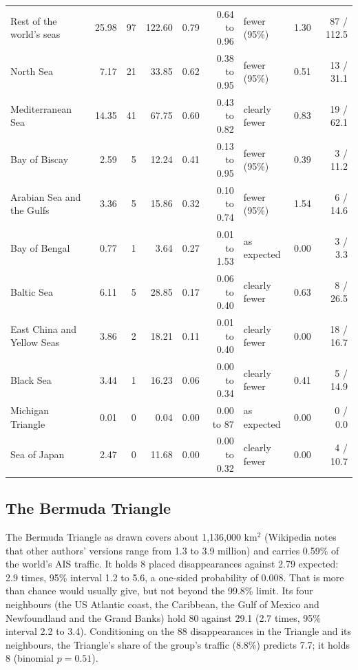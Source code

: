 \documentclass[11pt,a4paper]{article}
\begin{document}
\begin{table}[tbp]
\begin{tabular}{p{4.0cm}rrrrrlrr}
Rest of the world's seas & 25.98 & 97 & 122.60 & 0.79 & 0.64 to 0.96 & fewer (95\%) & 1.30 & 87 / 112.5\\
North Sea & 7.17 & 21 & 33.85 & 0.62 & 0.38 to 0.95 & fewer (95\%) & 0.51 & 13 / 31.1\\
Mediterranean Sea & 14.35 & 41 & 67.75 & 0.60 & 0.43 to 0.82 & clearly fewer & 0.83 & 19 / 62.1\\
Bay of Biscay & 2.59 & 5 & 12.24 & 0.41 & 0.13 to 0.95 & fewer (95\%) & 0.39 & 3 / 11.2\\
Arabian Sea and the Gulfs & 3.36 & 5 & 15.86 & 0.32 & 0.10 to 0.74 & fewer (95\%) & 1.54 & 6 / 14.6\\
Bay of Bengal & 0.77 & 1 & 3.64 & 0.27 & 0.01 to 1.53 & as expected & 0.00 & 3 / 3.3\\
Baltic Sea & 6.11 & 5 & 28.85 & 0.17 & 0.06 to 0.40 & clearly fewer & 0.63 & 8 / 26.5\\
East China and Yellow Seas & 3.86 & 2 & 18.21 & 0.11 & 0.01 to 0.40 & clearly fewer & 0.00 & 18 / 16.7\\
Black Sea & 3.44 & 1 & 16.23 & 0.06 & 0.00 to 0.34 & clearly fewer & 0.41 & 5 / 14.9\\
Michigan Triangle & 0.01 & 0 & 0.04 & 0.00 & 0.00 to 87 & as expected & 0.00 & 0 / 0.0\\
Sea of Japan & 2.47 & 0 & 11.68 & 0.00 & 0.00 to 0.32 & clearly fewer & 0.00 & 4 / 10.7\\
\bottomrule\end{tabular}\end{table}

\subsection{The Bermuda Triangle}
The Bermuda Triangle as drawn covers about 1,136,000 km$^2$ (Wikipedia notes that other authors' versions range from 1.3 to 3.9 million) and carries 0.59\% of the world's AIS traffic. It holds 8 placed disappearances against 2.79 expected: 2.9 times, 95\% interval 1.2 to 5.6, a one-sided probability of 0.008. That is more than chance would usually give, but not beyond the 99.8\% limit. Its four neighbours (the US Atlantic coast, the Caribbean, the Gulf of Mexico and Newfoundland and the Grand Banks) hold 80 against 29.1 (2.7 times, 95\% interval 2.2 to 3.4). Conditioning on the 88 disappearances in the Triangle and its neighbours, the Triangle's share of the group's traffic (8.8\%) predicts 7.7; it holds 8 (binomial $p = 0.51$).
\end{document}
